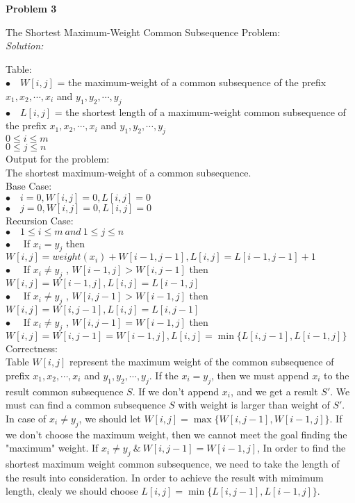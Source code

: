 \documentclass[12pt,letterpaper]{article}
\def\pp{\par\noindent}
\newcommand{\problem}[1]{ \bigskip \pp \textbf{Problem #1}\par}
\newcommand{\solution}{\textit{Solution:}\par}
\begin{document}
\problem{3}
The Shortest Maximum-Weight Common Subsequence Problem: \\
\solution
Table: \\
$\bullet \quad W[i,j]$ = the maximum-weight of a common subsequence of the prefix $x_1,x_2,\cdots,x_i$ and $y_1,y_2,\cdots,y_j$ \\
$\bullet \quad L[i,j]$ = the shortest length of a maximum-weight common subsequence of the prefix $x_1,x_2,\cdots,x_i$ and $y_1,y_2,\cdots,y_j$ \\
$ 0 \le i \le m $ \\
$ 0 \le j \le n $ \\
Output for the problem: \\
The shortest maximum-weight of a common subsequence. \\
Base Case: \\
$\bullet \quad i = 0, W[i,j] = 0, L[i,j] = 0$ \\
$\bullet \quad j = 0, W[i,j] = 0, L[i,j] = 0$ \\
Recursion Case: \\
$\bullet \quad 1 \le i \le m\  and\ 1 \le j \le n$ \\
$\bullet \quad $ If $x_i = y_j $ then $ W[i,j] = weight(x_i) + W[i-1,j-1] , L[i,j] = L[i-1,j-1] + 1$ \\
$\bullet \quad $ If $x_i \neq y_j $ , $W[i-1,j] > W[i,j-1] $ then $W[i,j] = W[i-1,j], L[i,j] = L[i-1,j]$ \\
$\bullet \quad $ If $x_i \neq y_j $ , $W[i,j-1] > W[i-1,j] $ then $W[i,j] = W[i,j-1], L[i,j] = L[i,j-1]$ \\
$\bullet \quad $ If $x_i \neq y_j $ , $W[i,j-1] = W[i-1,j] $ then $W[i,j] = W[i,j-1] = W[i-1,j], L[i,j] = \min \{ L[i,j-1], L[i-1,j] \}$ \\
Correctness: \\
Table $W[i,j]$ represent the maximum weight of the common subsequence of prefix $x_1,x_2,\cdots,x_i$ and $y_1,y_2,\cdots,y_j$. If the $x_i = y_j$, then we must append $x_i$ to the result common subsequence $S$. If we don't append $x_i$, and we get a result $S'$. We must can find a common subsequence $S$ with weight is larger than weight of $S'$. In case of $x_i \neq y_j$, we should let $W[i,j] = \max \{ W[i,j-1], W[i-1,j] \}$. If we don't choose the maximum weight, then we cannot meet the goal finding the "maximum" weight. If $x_i \neq y_j \ \&\  W[i,j-1] = W[i-1,j]$, In order to find the shortest maximum weight common subsequence, we need to take the length of the result into consideration. In order to achieve the result with mimimum length, clealy we should choose $L[i,j] = \min \{ L[i,j-1], L[i-1,j] \}$. \\
\end{document}
